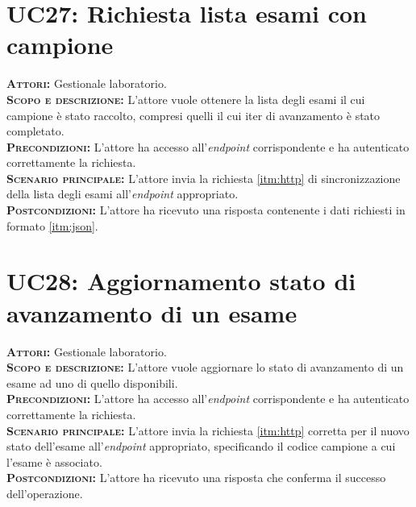\section{UC27: Richiesta lista esami con campione}
\label{sec:UC27}
\textsc{\textbf{Attori:}} Gestionale laboratorio.\\
\textsc{\textbf{Scopo e descrizione:}} L'attore vuole ottenere la lista degli esami il cui campione è stato raccolto, compresi quelli il cui iter di avanzamento è stato completato.\\
\textsc{\textsc{\textbf{Precondizioni:}}} L'attore ha accesso all'\textit{endpoint} corrispondente e ha autenticato correttamente la richiesta.\\
\textsc{\textbf{Scenario principale:}}  L'attore invia la richiesta \ref{itm:http} di sincronizzazione della lista degli esami all'\textit{endpoint} appropriato.\\
\textsc{\textbf{Postcondizioni:}} L'attore ha ricevuto una risposta contenente i dati richiesti in formato \ref{itm:json}.

\section{UC28: Aggiornamento stato di avanzamento di un esame}
\label{sec:UC28}
\textsc{\textbf{Attori:}} Gestionale laboratorio.\\
\textsc{\textbf{Scopo e descrizione:}} L'attore vuole aggiornare lo stato di avanzamento di un esame ad uno di quello disponibili.\\
\textsc{\textsc{\textbf{Precondizioni:}}} L'attore ha accesso all'\textit{endpoint} corrispondente e ha autenticato correttamente la richiesta.\\
\textsc{\textbf{Scenario principale:}}  L'attore invia la richiesta \ref{itm:http} corretta per il nuovo stato dell'esame all'\textit{endpoint} appropriato, specificando il codice campione a cui l'esame è associato.\\
\textsc{\textbf{Postcondizioni:}} L'attore ha ricevuto una risposta che conferma il successo dell'operazione.

